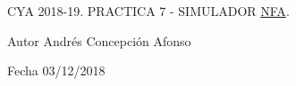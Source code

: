 C\+YA 2018-\/19. P\+R\+A\+C\+T\+I\+CA 7 -\/ S\+I\+M\+U\+L\+A\+D\+OR \mbox{\hyperlink{class_n_f_a}{N\+FA}}.

\begin{DoxyAuthor}{Autor}
Andrés Concepción Afonso 
\end{DoxyAuthor}
\begin{DoxyDate}{Fecha}
03/12/2018 
\end{DoxyDate}
